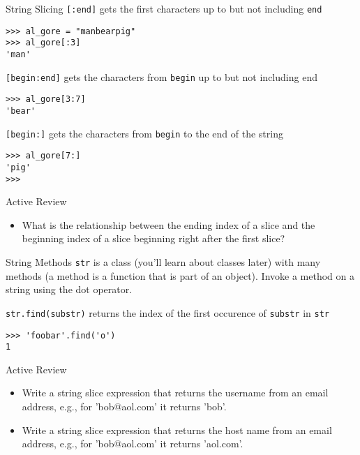 \documentclass[smaller, aspectratio=1610]{beamer}
\begin{document}
\begin{frame}[label={sec:org8a04649},fragile]{String Slicing}
 \texttt{[:end]} gets the first characters up to but not including \texttt{end}

\lstset{language=Python,label= ,caption= ,captionpos=b,numbers=none}
\begin{lstlisting}
>>> al_gore = "manbearpig"
>>> al_gore[:3]
'man'
\end{lstlisting}

\texttt{[begin:end]} gets the characters from \texttt{begin} up to but not including end

\lstset{language=Python,label= ,caption= ,captionpos=b,numbers=none}
\begin{lstlisting}
>>> al_gore[3:7]
'bear'
\end{lstlisting}

\texttt{[begin:]} gets the characters from \texttt{begin} to the end of the string

\lstset{language=Python,label= ,caption= ,captionpos=b,numbers=none}
\begin{lstlisting}
>>> al_gore[7:]
'pig'
>>>
\end{lstlisting}

\begin{block}{Active Review}
\begin{itemize}
\item What is the relationship between the ending index of a slice and the beginning index of a slice beginning right after the first slice?
\end{itemize}
\end{block}
\end{frame}

\begin{frame}[label={sec:org3b25475},fragile]{String Methods}
 \texttt{str} is a class (you'll learn about classes later) with many methods (a method is a function that is part of an object). Invoke a method on a string using the dot operator.

\texttt{str.find(substr)} returns the index of the first occurence of
\texttt{substr} in \texttt{str}

\lstset{language=Python,label= ,caption= ,captionpos=b,numbers=none}
\begin{lstlisting}
>>> 'foobar'.find('o')
1
\end{lstlisting}

\begin{block}{Active Review}
\begin{itemize}
\item Write a string slice expression that returns the username from an email address, e.g., for 'bob@aol.com' it returns 'bob'.
\item Write a string slice expression that returns the host name from an email address, e.g., for 'bob@aol.com' it returns 'aol.com'.
\end{itemize}
\end{block}
\end{frame}
\end{document}
